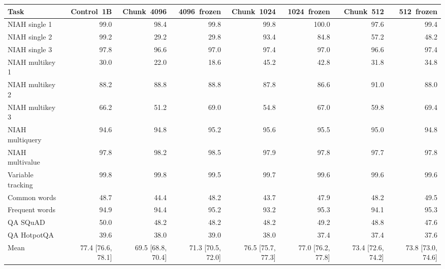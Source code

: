 \begin{tabular}{lrrrrrrr}
\toprule
Task & Control~1B & Chunk~4096 & 4096~frozen & Chunk~1024 & 1024~frozen & Chunk~512 & 512~frozen \\
\midrule
NIAH single 1 & 99.0 & 98.4 & 99.8 & 99.8 & 100.0 & 97.6 & 99.4 \\
NIAH single 2 & 99.2 & 29.2 & 29.8 & 93.4 & 84.8 & 57.2 & 48.2 \\
NIAH single 3 & 97.8 & 96.6 & 97.0 & 97.4 & 97.0 & 96.6 & 97.4 \\
NIAH multikey 1 & 30.0 & 22.0 & 18.6 & 45.2 & 42.8 & 31.8 & 34.8 \\
NIAH multikey 2 & 88.2 & 88.8 & 88.8 & 87.8 & 86.6 & 91.0 & 88.0 \\
NIAH multikey 3 & 66.2 & 51.2 & 69.0 & 54.8 & 67.0 & 59.8 & 69.4 \\
NIAH multiquery & 94.6 & 94.8 & 95.2 & 95.6 & 95.5 & 95.0 & 94.8 \\
NIAH multivalue & 97.8 & 98.2 & 98.5 & 97.9 & 97.8 & 97.7 & 97.8 \\
Variable tracking & 99.8 & 99.8 & 99.5 & 99.7 & 99.6 & 99.6 & 99.6 \\
Common words & 48.7 & 44.4 & 48.2 & 43.7 & 47.9 & 48.2 & 49.5 \\
Frequent words & 94.9 & 94.4 & 95.2 & 93.2 & 95.3 & 94.1 & 95.3 \\
QA SQuAD & 50.0 & 48.2 & 48.2 & 48.2 & 49.2 & 48.8 & 47.6 \\
QA HotpotQA & 39.6 & 38.0 & 39.0 & 38.0 & 37.4 & 37.4 & 37.6 \\
\midrule
Mean & 77.4 [76.6, 78.1] & 69.5 [68.8, 70.4] & 71.3 [70.5, 72.0] & 76.5 [75.7, 77.3] & 77.0 [76.2, 77.8] & 73.4 [72.6, 74.2] & 73.8 [73.0, 74.6] \\
\bottomrule
\end{tabular}
